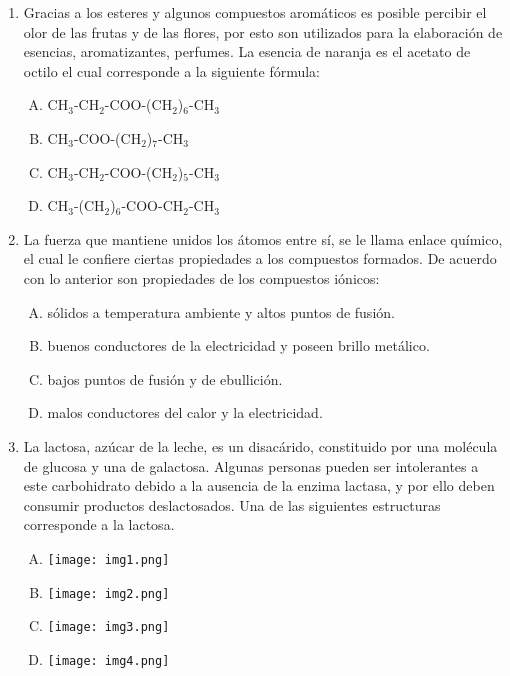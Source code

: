 
\begin{enumerate}
\item  Gracias a los esteres y algunos compuestos aromáticos es posible percibir el olor de las frutas y de las flores, por esto son utilizados para la elaboración de esencias, aromatizantes, perfumes. La esencia de naranja es el acetato de octilo el cual corresponde a la siguiente fórmula: \label{jenn-1}


\begin{enumerate}[(A)]
\item CH$_3$-CH$_2$-COO-(CH$_2$)$_6$-CH$_3$
\item CH$_3$-COO-(CH$_2$)$_7$-CH$_3$
\item CH$_3$-CH$_2$-COO-(CH$_2$)$_5$-CH$_3$
\item CH$_3$-(CH$_2$)$_6$-COO-CH$_2$-CH$_3$
\end{enumerate}


\item  La fuerza que mantiene unidos los átomos entre sí, se le llama enlace químico, el cual le confiere ciertas propiedades a los compuestos formados. De acuerdo con lo anterior son propiedades de los compuestos iónicos:\label{jenn-3}


\begin{enumerate}[(A)]
\item   sólidos a temperatura ambiente y altos puntos de fusión.
\item buenos conductores de la electricidad y poseen brillo metálico.
\item bajos puntos de fusión y de ebullición.
\item malos conductores del calor y la electricidad.
\end{enumerate}


\newpage
\item La lactosa, azúcar de la leche, es un disacárido, constituido por una molécula de glucosa y una de galactosa. Algunas personas pueden ser intolerantes a este carbohidrato debido a la ausencia de la enzima lactasa, y por ello deben consumir productos deslactosados. Una de las siguientes estructuras corresponde a la lactosa. \label{jenn-2}
\begin{enumerate}[(A)]
\item \texttt{[image: img1.png]}
\item \texttt{[image: img2.png]}
\item \texttt{[image: img3.png]}\\
\item \texttt{[image: img4.png]}
\end{enumerate}






\end{enumerate}
